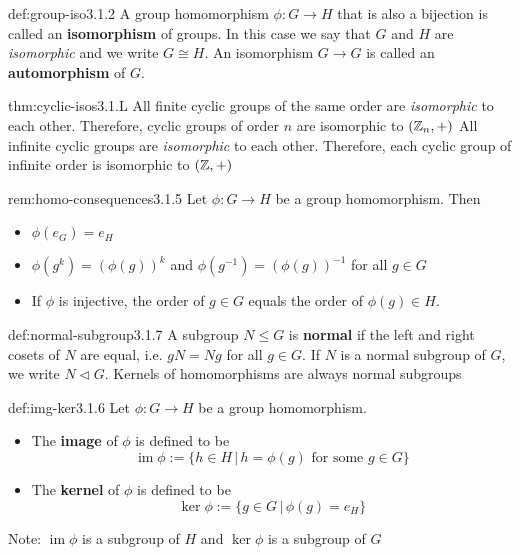 \documentclass[landscape, 8pt]{extarticle}
\DeclareMathOperator{\Ima}{im}
\begin{document}
\begin{multicols}{3}
\begin{dfn}{def:group-iso}{3.1.2}
    A group homomorphism $\phi:G\to H$ that is also a bijection is called an \textbf{isomorphism} of groups. In this case we say that $G$ and $H$ are \textit{isomorphic} and we write $G\cong H$. 
    An isomorphism $G\to G$ is called an \textbf{automorphism} of $G$.
\end{dfn}
\vspace{-5pt}

\begin{thm}{thm:cyclic-isos}{3.1.L}
All finite cyclic groups of the same order are \textit{isomorphic} to each other. Therefore, cyclic groups of order $n$ are isomorphic to $(\mathbb{Z}_{n}, +)$
\vspace{0pt}\newline
All infinite cyclic groups are \textit{isomorphic} to each other. Therefore, each cyclic group of infinite order is isomorphic to $(\mathbb{Z}, +)$
\end{thm}
\vspace{-5pt}

\begin{rem}{rem:homo-consequences}{3.1.5}
Let $\phi:G\to H$ be a group homomorphism. Then
\renewcommand\labelitemi{\tiny$\bullet$}
\begin{itemize}
    \setlength\itemsep{0em}
    \item $\phi(e_{G})=e_{H}$
    \item $\phi(g^k)=(\phi(g))^{k}$ and $\phi(g^{-1})=(\phi(g))^{-1}$ for all $g\in G$
    \item If $\phi$ is injective, the order of $g\in G$ equals the order of $\phi(g)\in H$.
\end{itemize}
\end{rem}
\vspace{-5pt}

\begin{dfn}{def:normal-subgroup}{3.1.7}
    A subgroup $N\le G$ is \textbf{normal} if the left and right cosets of $N$ are equal, i.e. $gN = Ng$ for all $g\in G$. If $N$ is a normal subgroup of $G$, we write $N\triangleleft G$. Kernels of homomorphisms are always normal subgroups
\end{dfn}
\vspace{-5pt}

\begin{dfn}{def:img-ker}{3.1.6}
    Let $\phi:G\to H$ be a group homomorphism.
    \renewcommand\labelitemi{\tiny$\bullet$}
    \begin{itemize}
        \setlength\itemsep{0em}
        \item The \textbf{image} of $\phi$ is defined to be
        \[\Ima{\phi} := \{h\in H\,|\,h=\phi(g)\text{ for some } g\in G\}\]
        \item The \textbf{kernel} of $\phi$ is defined to be
        \[\ker{\phi}:= \{g\in G\,|\,\phi(g) = e_{H}\}\]
    \end{itemize}
    Note: $\Ima{\phi}$ is a subgroup of $H$ and $\ker{\phi}$ is a subgroup of $G$
\end{dfn}
\vspace{-5pt}


\end{multicols}
\end{document}
